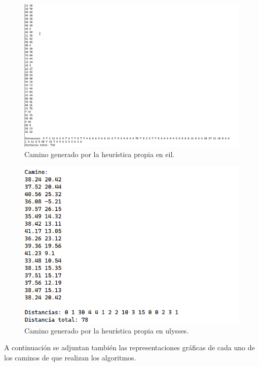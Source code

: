 \begin{figure}[H]
  \centering
  \includegraphics[scale=0.5]{img/dist-kr-eil.png}
  \caption{Camino generado por la heurística propia en eil.}
\end{figure}

\begin{figure}[H]
  \centering
  \includegraphics[scale=0.5]{img/dist-kr-ulysses.png}
  \caption{Camino generado por la heurística propia en ulysses.}
\end{figure} 

A continuación se adjuntan también las representaciones gráficas de cada
uno de los caminos de que realizan los algoritmos.

